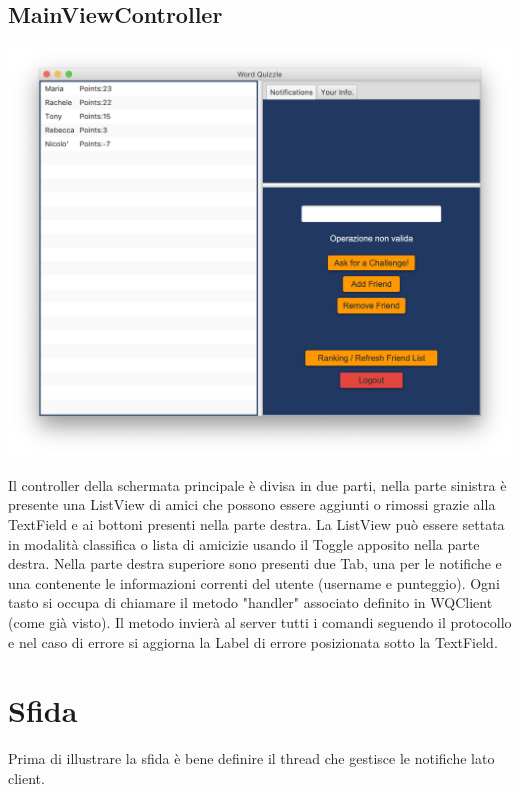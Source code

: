 \documentclass{article}
\begin{document}
\subsection{MainViewController}
\begin{center}
\includegraphics[scale=0.5]{quizzlemain.png}
\end{center}
Il controller della schermata principale è divisa in due parti, nella parte sinistra è presente una ListView di amici che possono essere aggiunti o rimossi grazie alla TextField e ai bottoni presenti nella parte destra. La ListView può essere settata in modalità classifica o lista di amicizie usando il Toggle apposito nella parte destra.
Nella parte destra superiore sono presenti due Tab, una per le notifiche e una contenente le informazioni correnti del utente (username e punteggio).
Ogni tasto si occupa di chiamare il metodo "handler" associato definito in WQClient (come già visto). Il metodo invierà al server tutti i comandi seguendo il protocollo e nel caso di errore si aggiorna la Label di errore posizionata sotto la TextField.
\clearpage

\section{Sfida}
Prima di illustrare la sfida è bene definire il thread che gestisce le notifiche lato client.
\end{document}
